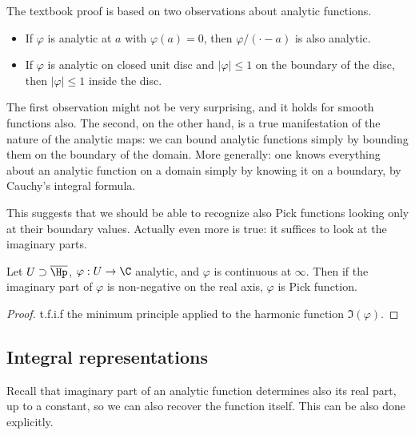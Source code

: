 The textbook proof is based on two observations about analytic functions.
\begin{itemize}
	\item If $\varphi$ is analytic at $a$ with $\varphi(a) = 0$, then $\varphi/(\cdot - a)$ is also analytic.
	\item If $\varphi$ is analytic on closed unit disc and $|\varphi| \leq 1$ on the boundary of the disc, then $|\varphi| \leq 1$ inside the disc.
\end{itemize}

The first observation might not be very surprising, and it holds for smooth functions also. The second, on the other hand, is a true manifestation of the nature of the analytic maps: we can bound analytic functions simply by bounding them on the boundary of the domain. More generally: one knows everything about an analytic function on a domain simply by knowing it on a boundary, by Cauchy's integral formula.

This suggests that we should be able to recognize also Pick functions looking only at their boundary values. Actually even more is true: it suffices to look at the imaginary parts.

\begin{prop}
	Let $U \supset \overline{\Hp}$, $\varphi : U \to \C$ analytic, and $\varphi$ is continuous at $\infty$. Then if the imaginary part of $\varphi$ is non-negative on the real axis, $\varphi$ is Pick function.
\end{prop}
\begin{proof}
	t.f.i.f the minimum principle applied to the harmonic function $\Im(\varphi)$.
\end{proof}

\subsection{Integral representations}

Recall that imaginary part of an analytic function determines also its real part, up to a constant, so we can also recover the function itself. This can be also done explicitly.

